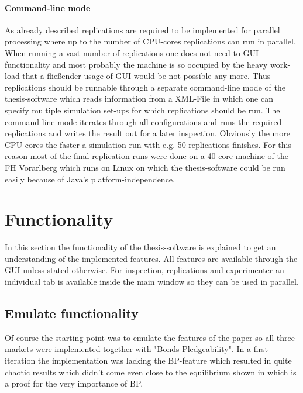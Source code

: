 \documentclass[Bachelorarbeit.tex]{subfiles}
\begin{document}
\paragraph{Command-line mode}
As already described replications are required to be implemented for parallel processing where up to the number of CPU-cores replications can run in parallel. When running a vast number of replications one does not need to GUI-functionality and most probably the machine is so occupied by the heavy work-load that a fließender usage of GUI would be not possible any-more. Thus replications should be runnable through a separate command-line mode of the thesis-software which reads information from a XML-File in which one can specify multiple simulation set-ups for which replications should be run. The command-line mode iterates through all configurations and runs the required replications and writes the result out for a later inspection. Obviously the more CPU-cores the faster a simulation-run with e.g. 50 replications finishes. For this reason most of the final replication-runs were done on a 40-core machine of the FH Vorarlberg which runs on Linux on which the thesis-software could be run easily because of Java's platform-independence.

\section{Functionality}
In this section the functionality of the thesis-software is explained to get an understanding of the implemented features. All features are available through the GUI unless stated otherwise. For inspection, replications and experimenter an individual tab is available inside the main window so they can be used in parallel.

\subsection{Emulate \cite{Breuer2015} functionality}
Of course the starting point was to emulate the features of the \cite{Breuer2015} paper so all three markets were implemented together with "Bonds Pledgeability". In a first iteration the implementation was lacking the BP-feature which resulted in quite chaotic results which didn't come even close to the equilibrium shown in \cite{Breuer2015} which is a proof for the very importance of BP.
\end{document}
